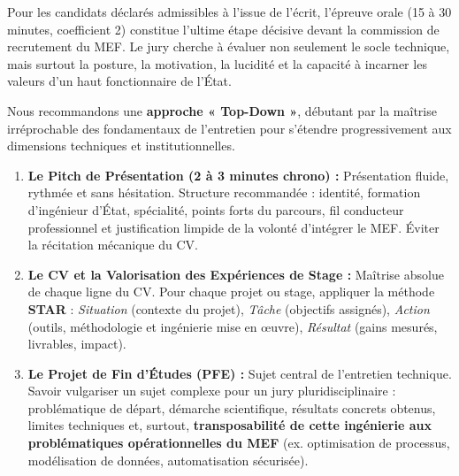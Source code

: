 Pour les candidats déclarés admissibles à l'issue de l'écrit, l'épreuve orale (15 à 30 minutes, coefficient 2) constitue l'ultime étape décisive devant la commission de recrutement du MEF. Le jury cherche à évaluer non seulement le socle technique, mais surtout la posture, la motivation, la lucidité et la capacité à incarner les valeurs d'un haut fonctionnaire de l'État.

Nous recommandons une \textbf{approche « Top-Down »}, débutant par la maîtrise irréprochable des fondamentaux de l'entretien pour s'étendre progressivement aux dimensions techniques et institutionnelles.

\begin{tcolorbox}[colback=blue!5!white,colframe=chaporange,title=\textbf{La Feuille de Route des 11 Piliers de l'Épreuve Orale (Approche Top-Down)}]
\begin{enumerate}[label=\textbf{\arabic*.}]
    \item \textbf{Le Pitch de Présentation (2 à 3 minutes chrono) :}
    Présentation fluide, rythmée et sans hésitation. Structure recommandée : identité, formation d'ingénieur d'État, spécialité, points forts du parcours, fil conducteur professionnel et justification limpide de la volonté d'intégrer le MEF. Éviter la récitation mécanique du CV.

    \item \textbf{Le CV et la Valorisation des Expériences de Stage :}
    Maîtrise absolue de chaque ligne du CV. Pour chaque projet ou stage, appliquer la méthode \textbf{STAR} : \textit{Situation} (contexte du projet), \textit{Tâche} (objectifs assignés), \textit{Action} (outils, méthodologie et ingénierie mise en œuvre), \textit{Résultat} (gains mesurés, livrables, impact).

    \item \textbf{Le Projet de Fin d'Études (PFE) :}
    Sujet central de l'entretien technique. Savoir vulgariser un sujet complexe pour un jury pluridisciplinaire : problématique de départ, démarche scientifique, résultats concrets obtenus, limites techniques et, surtout, \textbf{transposabilité de cette ingénierie aux problématiques opérationnelles du MEF} (ex. optimisation de processus, modélisation de données, automatisation sécurisée).


\end{enumerate}
\end{tcolorbox}
